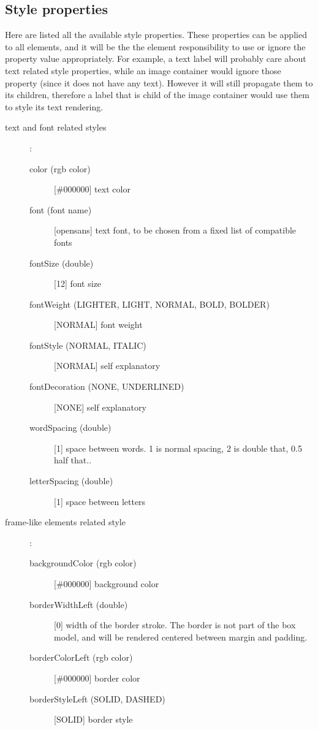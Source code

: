 \subsection{Style properties}

Here are listed all the available style properties. These properties can be applied to all elements, and it will be the the element responsibility to use or ignore the property value appropriately. For example, a text label will probably care about text related style properties, while an image container would ignore those property (since it does not have any text). However it will still propagate them to its children, therefore a label that is child of the image container would use them to style its text rendering.

\begin{description}
    \item[text and font related styles] :
    \begin{description}
        \item[color (rgb color)] [\#000000] text color
        \item[font (font name)] [opensans] text font, to be chosen from a fixed list of compatible fonts
        \item[fontSize (double)] [12] font size
        \item[fontWeight (LIGHTER, LIGHT, NORMAL, BOLD, BOLDER)] [NORMAL] font weight
        \item[fontStyle (NORMAL, ITALIC)] [NORMAL] self explanatory
        \item[fontDecoration (NONE, UNDERLINED)] [NONE] self explanatory
        \item[wordSpacing (double)] [1] space between words. 1 is normal spacing, 2 is double that, 0.5 half that..
        \item[letterSpacing (double)] [1] space between letters
    \end{description}
    \item[frame-like elements related style] :
    \begin{description}
        \item[backgroundColor (rgb color)] [\#000000] background color
        \item[borderWidthLeft (double)] [0] width of the border stroke. The border is not part of the box model, and will be rendered centered between margin and padding.
        \item[borderColorLeft (rgb color)] [\#000000] border color
        \item[borderStyleLeft (SOLID, DASHED)] [SOLID] border style

\end{description}
\end{description}
